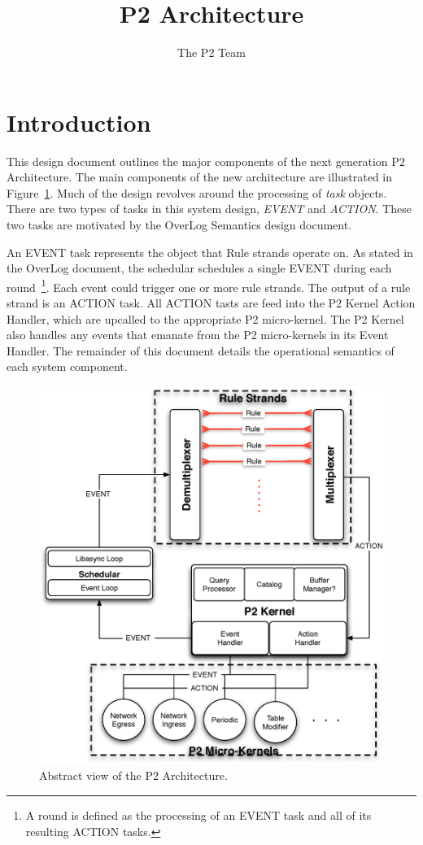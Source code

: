 \documentclass[12pt]{article}
\begin{document}
\title{P2 Architecture}
\author{The P2 Team}
\maketitle

\section{Introduction}

This design document outlines the major components of the next generation P2
Architecture. The main components of the new architecture are illustrated in 
Figure~\ref{fig:arch}. Much of the design revolves around the processing of 
\emph{task} objects. There are two types of tasks in this system design, 
\emph{EVENT} and \emph{ACTION}. These two tasks are motivated by the 
OverLog Semantics design document. 

An EVENT task represents the object that Rule strands operate on. As stated in the OverLog document, the schedular schedules a single EVENT during each 
round~\footnote{A round is defined as the processing of an EVENT task and all of its
resulting ACTION tasks.}. Each event could trigger one or more rule strands. The 
output of a rule strand is an ACTION task. All ACTION tasts are feed into the P2 
Kernel Action Handler, which are upcalled to the appropriate P2 micro-kernel. The 
P2 Kernel also handles any events that emanate from the P2 micro-kernels in its
Event Handler. The remainder of this document details the operational semantics 
of each system component.

\begin{figure}
   \centering
   \includegraphics[width=6in]{p2-arch.eps} 
   \caption{Abstract view of the P2 Architecture.}
   \label{fig:arch}
\end{figure}
\end{document}
